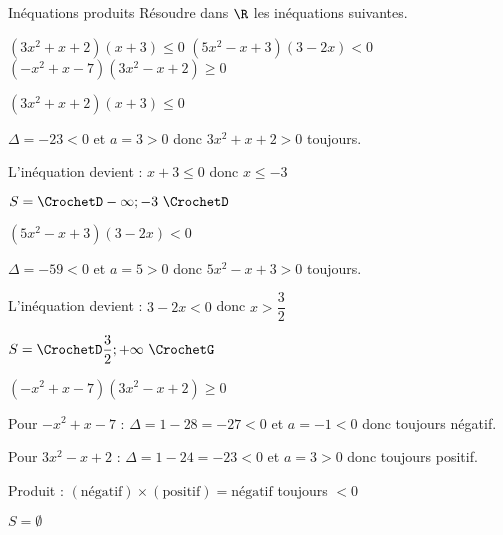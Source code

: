 \def\rdifficulty{2.5}
\begin{EXO}{Inéquations produits}{}
Résoudre dans $\R$ les inéquations suivantes.
\begin{tcbenumerate}[3]
\tcbitem {} $(3x^2+x+2)(x+3)\leqslant 0$
\tcbitem {} $(5x^2-x+3)(3-2x)<0$
\tcbitem {} $(-x^2+x-7)(3x^2-x+2)\geqslant 0$\\
\end{tcbenumerate}

\exocorrection

\begin{tcbenumerate}[1]
\tcbitem $(3x^2+x+2)(x+3)\leqslant 0$


$\Delta = -23 < 0$ et $a=3>0$ donc $3x^2+x+2 > 0$ toujours.

L'inéquation devient : $x+3\leqslant 0$ donc $x \leqslant -3$

$S = \CrochetD-\infty;-3\,\,\CrochetD$

\tcbitem $(5x^2-x+3)(3-2x)<0$


$\Delta = -59 < 0$ et $a=5>0$ donc $5x^2-x+3 > 0$ toujours.

L'inéquation devient : $3-2x<0$ donc $x > \dfrac{3}{2}$

$S = \CrochetD\dfrac{3}{2};+\infty\,\,\CrochetG$

\tcbitem $(-x^2+x-7)(3x^2-x+2)\geqslant 0$

Pour $-x^2+x-7$ : $\Delta = 1-28 = -27 < 0$ et $a=-1<0$ donc toujours négatif.

Pour $3x^2-x+2$ : $\Delta = 1-24 = -23 < 0$ et $a=3>0$ donc toujours positif.

Produit : $(\text{négatif}) \times (\text{positif}) = \text{négatif}$ toujours $< 0$

$S = \emptyset$
\end{tcbenumerate}
\end{EXO}
\def\rdifficulty{2.5}
